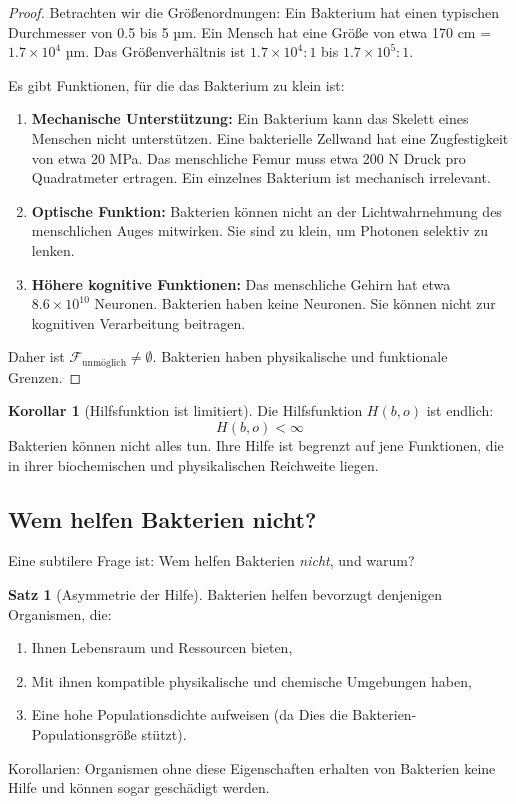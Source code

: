 \documentclass[a4paper,12pt]{article}
\theoremstyle{definition}
\newtheorem{satz}{Satz}
\newtheorem{korollar}{Korollar}
\begin{document}
\begin{proof}
Betrachten wir die Größenordnungen: Ein Bakterium hat einen typischen Durchmesser von 0.5 bis 5 µm. Ein Mensch hat eine Größe von etwa 170 cm = $1.7 \times 10^{4}$ µm. Das Größenverhältnis ist $1.7 \times 10^{4} : 1$ bis $1.7 \times 10^{5} : 1$.

Es gibt Funktionen, für die das Bakterium zu klein ist:
\begin{enumerate}
    \item \textbf{Mechanische Unterstützung:} Ein Bakterium kann das Skelett eines Menschen nicht unterstützen. Eine bakterielle Zellwand hat eine Zugfestigkeit von etwa 20 MPa. Das menschliche Femur muss etwa 200 N Druck pro Quadratmeter ertragen. Ein einzelnes Bakterium ist mechanisch irrelevant.
    
    \item \textbf{Optische Funktion:} Bakterien können nicht an der Lichtwahrnehmung des menschlichen Auges mitwirken. Sie sind zu klein, um Photonen selektiv zu lenken.
    
    \item \textbf{Höhere kognitive Funktionen:} Das menschliche Gehirn hat etwa $8.6 \times 10^{10}$ Neuronen. Bakterien haben keine Neuronen. Sie können nicht zur kognitiven Verarbeitung beitragen.
\end{enumerate}

Daher ist $\mathcal{F}_{\text{unmöglich}} \neq \emptyset$. Bakterien haben physikalische und funktionale Grenzen.
\end{proof}

\begin{korollar}[Hilfsfunktion ist limitiert]
Die Hilfsfunktion $H(b, o)$ ist endlich:
\[
H(b, o) < \infty
\]
Bakterien können nicht alles tun. Ihre Hilfe ist begrenzt auf jene Funktionen, die in ihrer biochemischen und physikalischen Reichweite liegen.
\end{korollar}

\subsection{Wem helfen Bakterien nicht?}

Eine subtilere Frage ist: Wem helfen Bakterien \emph{nicht}, und warum?

\begin{satz}[Asymmetrie der Hilfe]
Bakterien helfen bevorzugt denjenigen Organismen, die:
\begin{enumerate}
    \item Ihnen Lebensraum und Ressourcen bieten,
    \item Mit ihnen kompatible physikalische und chemische Umgebungen haben,
    \item Eine hohe Populationsdichte aufweisen (da Dies die Bakterien-Populationsgröße stützt).
\end{enumerate}
Korollarien: Organismen ohne diese Eigenschaften erhalten von Bakterien keine Hilfe und können sogar geschädigt werden.
\end{satz}
\end{document}
